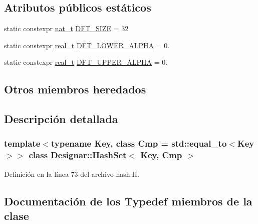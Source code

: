 \subsection*{Atributos públicos estáticos}
\begin{DoxyCompactItemize}
\item 
static constexpr \hyperlink{namespace_designar_aa72662848b9f4815e7bf31a7cf3e33d1}{nat\+\_\+t} \hyperlink{class_designar_1_1_hash_set_a23c3da93ad9449838ab2c78526cd9dbd}{D\+F\+T\+\_\+\+S\+I\+ZE} = 32
\item 
static constexpr \hyperlink{namespace_designar_aca2c32af26808dbec1f3a3071fad25ce}{real\+\_\+t} \hyperlink{class_designar_1_1_hash_set_a71c4eb3bdbf207310cb61832e0c44fdf}{D\+F\+T\+\_\+\+L\+O\+W\+E\+R\+\_\+\+A\+L\+P\+HA} = 0.
\item 
static constexpr \hyperlink{namespace_designar_aca2c32af26808dbec1f3a3071fad25ce}{real\+\_\+t} \hyperlink{class_designar_1_1_hash_set_ab7e07181f29465aa1457e6abb9397be1}{D\+F\+T\+\_\+\+U\+P\+P\+E\+R\+\_\+\+A\+L\+P\+HA} = 0.
\end{DoxyCompactItemize}
\subsection*{Otros miembros heredados}


\subsection{Descripción detallada}
\subsubsection*{template$<$typename Key, class Cmp = std\+::equal\+\_\+to$<$\+Key$>$$>$\newline
class Designar\+::\+Hash\+Set$<$ Key, Cmp $>$}



Definición en la línea 73 del archivo hash.\+H.



\subsection{Documentación de los \textquotesingle{}Typedef\textquotesingle{} miembros de la clase}
\mbox{\label{class_designar_1_1_hash_set_ad0ab040392888a3320d2d72d1ead9968}} 
